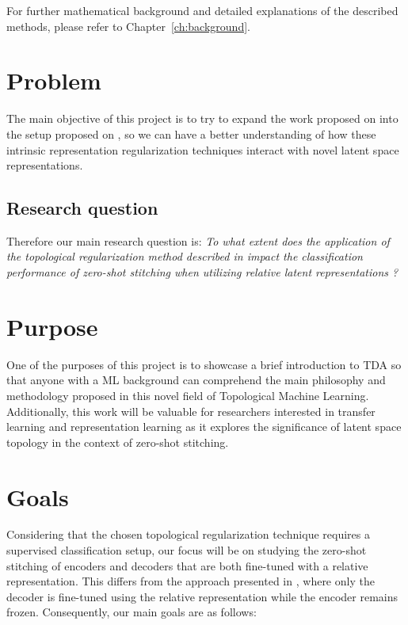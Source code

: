 \documentclass[../main.tex]{subfiles}
\begin{document}
For further mathematical background and detailed explanations of the described methods, please refer to Chapter~\ref{ch:background}.

\section{Problem}
\label{sec:problem}


The main objective of this project is to try to expand the work proposed on \cite{hofer_densified_2021} into the setup proposed on \cite{moschella_relative_2022}, so we can have a better understanding of how these intrinsic representation regularization techniques interact with novel latent space representations.

\subsection{Research question}
\label{sec:researchQuestion}

Therefore our main research question is: \emph{To what extent does the application of the topological regularization method described in \cite{hofer_densified_2021} impact the classification performance of zero-shot stitching when utilizing relative latent representations \cite{moschella_relative_2022}?}

\section{Purpose}

One of the purposes of this project is to showcase a brief introduction to TDA so that anyone with a ML background can comprehend the main philosophy and methodology proposed in this novel field of Topological Machine Learning. Additionally, this work will be valuable for researchers interested in transfer learning and representation learning as it explores the significance of latent space topology in the context of zero-shot stitching.


\section{Goals}

Considering that the chosen topological regularization technique \cite{hofer_densified_2021} requires a supervised classification setup, our focus will be on studying the zero-shot stitching of encoders and decoders that are both fine-tuned with a relative representation. This differs from the approach presented in \cite{moschella_relative_2022}, where only the decoder is fine-tuned using the relative representation while the encoder remains frozen. Consequently, our main goals are as follows:
\end{document}
